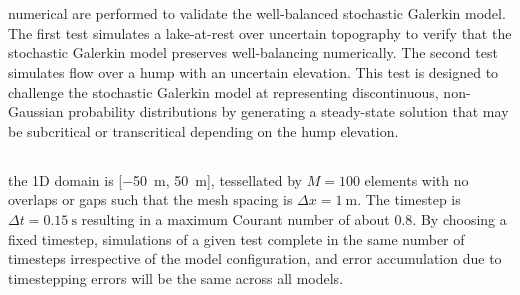 \section{}

 numerical  are performed to validate the well-balanced stochastic Galerkin model.
The first test simulates a lake-at-rest over  uncertain topography to verify that the stochastic Galerkin model preserves well-balancing numerically.
The second test simulates flow over a hump with an uncertain elevation.
This test is designed to challenge the stochastic Galerkin model at representing discontinuous, non-Gaussian probability distributions by generating a steady-state solution that may be subcritical or transcritical depending on the hump elevation.

\subsection{}
 the 1D domain is [\SI{-50}{\meter}, \SI{50}{\meter}], tessellated by $M = 100$ elements with no overlaps or gaps such that the mesh spacing is $\Delta x = \SI{1}{\meter}$.
The timestep is $\Delta t = \SI{0.15}{\second}$ resulting in a maximum Courant number of about $0.8$.
By choosing a fixed timestep, simulations of a given test complete in the same number of timesteps irrespective of the model configuration, and error accumulation due to timestepping errors will be the same across all models.

